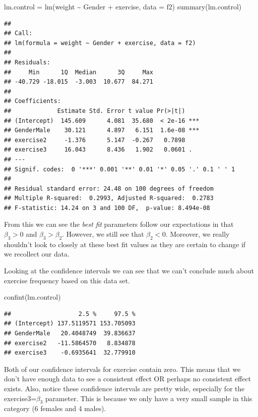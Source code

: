 \documentclass[
]{book}
\newenvironment{Shaded}{\begin{snugshade}}{\end{snugshade}}
\newcommand{\AttributeTok}[1]{\textcolor[rgb]{0.77,0.63,0.00}{#1}}
\newcommand{\FunctionTok}[1]{\textcolor[rgb]{0.00,0.00,0.00}{#1}}
\newcommand{\NormalTok}[1]{#1}
\newcommand{\OtherTok}[1]{\textcolor[rgb]{0.56,0.35,0.01}{#1}}
\newcommand{\SpecialCharTok}[1]{\textcolor[rgb]{0.00,0.00,0.00}{#1}}
\theoremstyle{definition}
\theoremstyle{definition}
\theoremstyle{definition}
\theoremstyle{definition}
\theoremstyle{remark}
\begin{document}
\begin{Shaded}
\begin{Highlighting}[]
\NormalTok{lm.control }\OtherTok{=} \FunctionTok{lm}\NormalTok{(weight }\SpecialCharTok{\textasciitilde{}}\NormalTok{ Gender }\SpecialCharTok{+}\NormalTok{ exercise, }\AttributeTok{data =}\NormalTok{ f2)}
\FunctionTok{summary}\NormalTok{(lm.control)}
\end{Highlighting}
\end{Shaded}

\begin{verbatim}
## 
## Call:
## lm(formula = weight ~ Gender + exercise, data = f2)
## 
## Residuals:
##     Min      1Q  Median      3Q     Max 
## -40.729 -18.015  -3.003  10.677  84.271 
## 
## Coefficients:
##             Estimate Std. Error t value Pr(>|t|)    
## (Intercept)  145.609      4.081  35.680  < 2e-16 ***
## GenderMale    30.121      4.897   6.151  1.6e-08 ***
## exercise2     -1.376      5.147  -0.267   0.7898    
## exercise3     16.043      8.436   1.902   0.0601 .  
## ---
## Signif. codes:  0 '***' 0.001 '**' 0.01 '*' 0.05 '.' 0.1 ' ' 1
## 
## Residual standard error: 24.48 on 100 degrees of freedom
## Multiple R-squared:  0.2993, Adjusted R-squared:  0.2783 
## F-statistic: 14.24 on 3 and 100 DF,  p-value: 8.494e-08
\end{verbatim}

From this we can see the \emph{best fit} parameters follow our expectations in that \(\beta_3>0\) and \(\beta_3>\beta_2\). However, we still see that \(\beta_2<0\). Moreover, we really shouldn't look to closely at these best fit values as they are certain to change if we recollect our data.

Looking at the confidence intervals we can see that we can't conclude much about exercise frequency based on this data set.

\begin{Shaded}
\begin{Highlighting}[]
\FunctionTok{confint}\NormalTok{(lm.control)}
\end{Highlighting}
\end{Shaded}

\begin{verbatim}
##                   2.5 %     97.5 %
## (Intercept) 137.5119571 153.705093
## GenderMale   20.4048749  39.836637
## exercise2   -11.5864570   8.834878
## exercise3    -0.6935641  32.779910
\end{verbatim}

Both of our confidence intervals for exercise contain zero. This means that we don't have enough data to see a consistent effect OR perhaps no consistent effect exists. Also, notice these confidence intervals are pretty wide, especially for the exercise3=\(\beta_3\) parameter. This is because we only have a very small sample in this category (6 females and 4 males).
\end{document}

